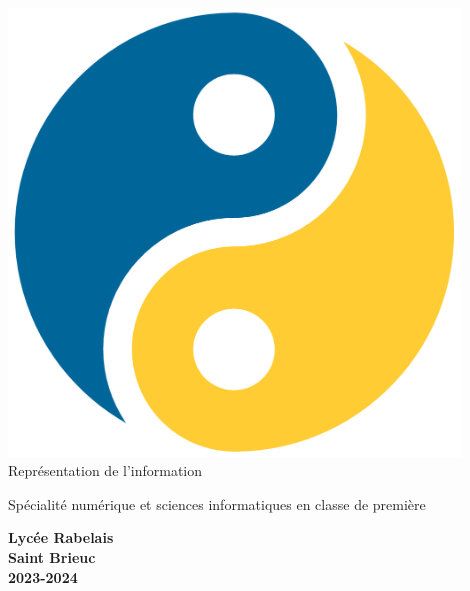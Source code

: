 \begin{titlepage}
    \begin{center}
        \includegraphics[width=12cm]{titlepage/img/yin_yang_python}\\[2em]

        {\bigtitlefont \large\color{gray} Représentation de l'information}

        {\titlefont\Large\color{gray} Spécialité numérique et sciences informatiques en classe de première\\[2em]}

        {\color{gray}\textbf{Lycée Rabelais\\ Saint Brieuc\\ 2023-2024}}
    \end{center}
\end{titlepage}